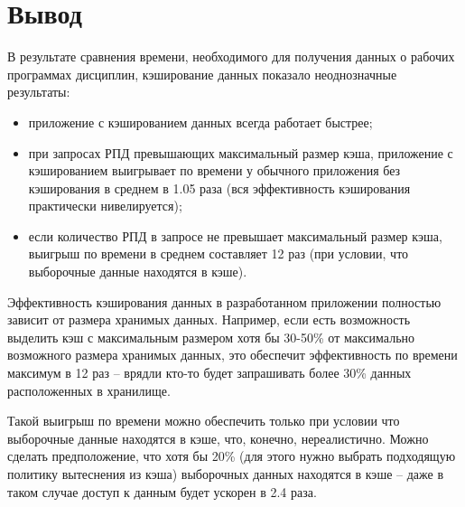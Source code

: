 \begin{table}[H]
	\centering
	\caption{Результаты сравнения времени, необходимого для получениях данных без кэширования и с кэшированием (размер кэша - 5000 единиц)}
	\label{tbl:experiment3}
\end{table}

\section*{Вывод}

В результате сравнения времени, необходимого для получения данных о рабочих программах дисциплин, кэширование данных показало неоднозначные результаты: 

\begin{itemize}
	\item приложение с кэшированием данных всегда работает быстрее;
	\item при запросах РПД превышающих максимальный размер кэша, приложение с кэшированием выигрывает по времени у обычного приложения без кэширования в среднем в 1.05 раза (вся эффективность кэширования практически нивелируется);
	\item если количество РПД в запросе не превышает максимальный размер кэша, выигрыш по времени в среднем составляет 12 раз (при условии, что выборочные данные находятся в кэше).
\end{itemize}

Эффективность кэширования данных в разработанном приложении полностью зависит от размера хранимых данных. Например, если есть возможность выделить кэш с максимальным размером хотя бы 30-50\% от максимально возможного размера хранимых данных, это обеспечит эффективность по времени максимум в 12 раз -- врядли кто-то будет запрашивать более 30\% данных расположенных в хранилище. 

Такой выигрыш по времени можно обеспечить только при условии что выборочные данные находятся в кэше, что, конечно, нереалистично. Можно сделать предположение, что хотя бы 20\% (для этого нужно выбрать подходящую политику вытеснения из кэша) выборочных данных находятся в кэше -- даже в таком случае доступ к данным будет ускорен в 2.4 раза.